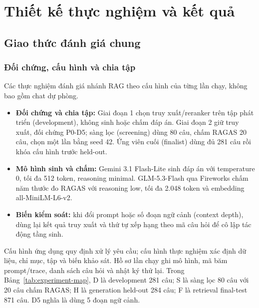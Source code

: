 \clearpage
\section{Thiết kế thực nghiệm và kết quả}
\subsection{Giao thức đánh giá chung}
\subsubsection{Đối chứng, cấu hình và chia tập}
Các thực nghiệm đánh giá nhánh RAG theo cấu hình của từng lần chạy, không bao gồm chat dự phòng.
\begin{itemize}
\item \textbf{Đối chứng và chia tập:} Giai đoạn 1 chọn truy xuất/reranker trên tập phát triển (development), không sinh hoặc chấm đáp án. Giai đoạn 2 giữ truy xuất, đối chứng P0-D5; sàng lọc (screening) dùng 80 câu, chấm RAGAS 20 câu, chọn một lần bằng seed 42. Ứng viên cuối (finalist) dùng đủ 281 câu rồi khóa cấu hình trước held-out.
\item \textbf{Mô hình sinh và chấm:} Gemini 3.1 Flash-Lite sinh đáp án với temperature 0, tối đa 512 token, reasoning minimal. GLM-5.3-Flash qua Fireworks chấm năm thước đo RAGAS với reasoning low, tối đa 2.048 token và embedding all-MiniLM-L6-v2.
\item \textbf{Biến kiểm soát:} khi đổi prompt hoặc số đoạn ngữ cảnh (context depth), dùng lại kết quả truy xuất và thứ tự xếp hạng theo mã câu hỏi để cô lập tác động tầng sinh.
\end{itemize}
Cấu hình ứng dụng quy định xử lý yêu cầu; cấu hình thực nghiệm xác định dữ liệu, chỉ mục, tập và biến khảo sát. Hồ sơ lần chạy ghi mô hình, mã băm prompt/trace, danh sách câu hỏi và nhật ký thử lại.
Trong Bảng~\ref{tab:experiment-map}, D là development 281 câu; S là sàng lọc 80 câu với 20 câu chấm RAGAS; H là generation held-out 284 câu; F là retrieval final-test 871 câu. D5 nghĩa là dùng 5 đoạn ngữ cảnh.
